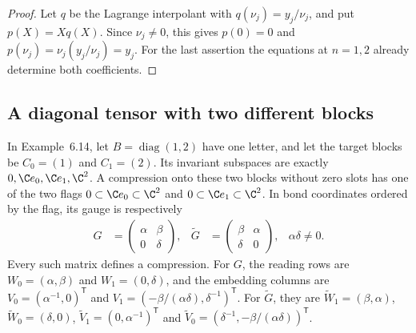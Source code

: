 \begin{proof}
    \leanok
    Let $q$ be the Lagrange interpolant with $q(\nu_j)=y_j/\nu_j$, and put
    $p(X)=Xq(X)$. Since $\nu_j\neq0$, this gives $p(0)=0$ and
    $p(\nu_j)=\nu_j(y_j/\nu_j)=y_j$. For the last assertion the equations
    at $n=1,2$ already determine both coefficients.
\end{proof}

\subsection{A diagonal tensor with two different blocks}

\begin{lemma}
    \label{lem:asym_example_diagonal_reductions}
    \leanok
    In Example~6.14, let $B=\operatorname{diag}(1,2)$ have one letter, and let the target blocks
    be $C_0=(1)$ and $C_1=(2)$. Its invariant subspaces are exactly
    $0,\C e_0,\C e_1,\C^2$. A compression onto these two blocks without zero
    slots has one of the two flags $0\subset\C e_0\subset\C^2$ and
    $0\subset\C e_1\subset\C^2$. In bond coordinates ordered by the flag, its
    gauge is respectively
    \begin{align}
        G            & =\begin{pmatrix}\alpha&\beta\\0&\delta\end{pmatrix}, &
        \widetilde G & =\begin{pmatrix}\beta&\alpha\\\delta&0\end{pmatrix},
                     & \alpha\delta\neq0.
    \end{align}
    Every such matrix defines a compression. For $G$, the reading rows are
    $W_0=(\alpha,\beta)$ and $W_1=(0,\delta)$, and the embedding columns are
    $V_0=(\alpha^{-1},0)^{\mathsf T}$ and
    $V_1=(-\beta/(\alpha\delta),\delta^{-1})^{\mathsf T}$.
    For $\widetilde G$, they are
    $\widetilde W_1=(\beta,\alpha)$, $\widetilde W_0=(\delta,0)$,
    $\widetilde V_1=(0,\alpha^{-1})^{\mathsf T}$ and
    $\widetilde V_0=(\delta^{-1},-\beta/(\alpha\delta))^{\mathsf T}$.
\end{lemma}


